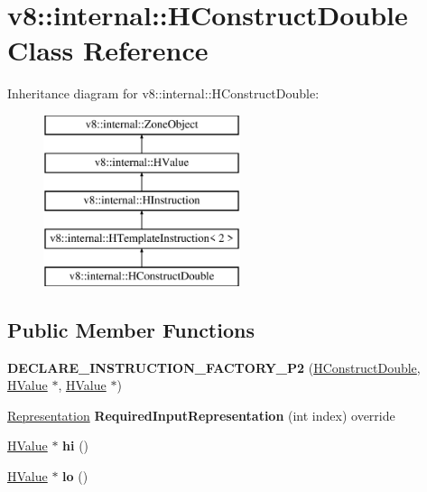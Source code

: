 \hypertarget{classv8_1_1internal_1_1_h_construct_double}{}\section{v8\+:\+:internal\+:\+:H\+Construct\+Double Class Reference}
\label{classv8_1_1internal_1_1_h_construct_double}
Inheritance diagram for v8\+:\+:internal\+:\+:H\+Construct\+Double\+:\begin{figure}[H]
\begin{center}
\leavevmode
\includegraphics[height=5.000000cm]{classv8_1_1internal_1_1_h_construct_double}
\end{center}
\end{figure}
\subsection*{Public Member Functions}
\begin{DoxyCompactItemize}
\item 
{\bfseries D\+E\+C\+L\+A\+R\+E\+\_\+\+I\+N\+S\+T\+R\+U\+C\+T\+I\+O\+N\+\_\+\+F\+A\+C\+T\+O\+R\+Y\+\_\+\+P2} (\hyperlink{classv8_1_1internal_1_1_h_construct_double}{H\+Construct\+Double}, \hyperlink{classv8_1_1internal_1_1_h_value}{H\+Value} $\ast$, \hyperlink{classv8_1_1internal_1_1_h_value}{H\+Value} $\ast$)\hypertarget{classv8_1_1internal_1_1_h_construct_double_a85cb4a756036b67b134e839b67cb0289}{}\label{classv8_1_1internal_1_1_h_construct_double_a85cb4a756036b67b134e839b67cb0289}

\item 
\hyperlink{classv8_1_1internal_1_1_representation}{Representation} {\bfseries Required\+Input\+Representation} (int index) override\hypertarget{classv8_1_1internal_1_1_h_construct_double_a2ffc69a568573e1c8d12e8604e1c8a1e}{}\label{classv8_1_1internal_1_1_h_construct_double_a2ffc69a568573e1c8d12e8604e1c8a1e}

\item 
\hyperlink{classv8_1_1internal_1_1_h_value}{H\+Value} $\ast$ {\bfseries hi} ()\hypertarget{classv8_1_1internal_1_1_h_construct_double_a71e0ccaba198bd87af667f8d4f9716de}{}\label{classv8_1_1internal_1_1_h_construct_double_a71e0ccaba198bd87af667f8d4f9716de}

\item 
\hyperlink{classv8_1_1internal_1_1_h_value}{H\+Value} $\ast$ {\bfseries lo} ()\hypertarget{classv8_1_1internal_1_1_h_construct_double_a1ffe62c0d747d985601fc135eeaf5a43}{}\label{classv8_1_1internal_1_1_h_construct_double_a1ffe62c0d747d985601fc135eeaf5a43}

\end{DoxyCompactItemize}
